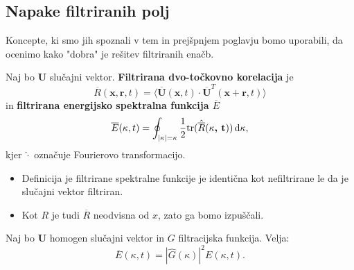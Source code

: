 \documentclass[mat2, tisk]{fmfdelo}
\newcommand{\bd}{\textbf}
\begin{document}
\subsection{Napake filtriranih polj}

Koncepte, ki smo jih spoznali v tem in prejšpnjem poglavju bomo 
uporabili, da ocenimo kako "dobra" je rešitev filtriranih enačb.

\begin{definicija}
Naj bo $\bd{U}$ slučajni vektor. \bd{Filtrirana dvo-točkovno korelacija}
je 
\begin{equation}
\overline{R}(\bd{x},\bd{r},t) = \langle \overline{\bd{U}}(\bd{x}, t) \cdot \overline{\bd{U}}^T(\bd{x} + \bd{r}, t) \rangle
\end{equation} 
in \bd{filtrirana energijsko spektralna funkcija $\overline{E}$} 
\begin{equation}
\overline{E}(\kappa, t) = \oint_{|\bd{\text{$\kappa$}}| = \kappa} \frac{1}{2} \text{tr}(\hat{\overline{R}}(\bd{\text{$\kappa$}, t})) \dif \bd{\text{$\kappa$}},
\end{equation}
kjer $\hat{\cdot}$ označuje Fourierovo transformacijo.
\end{definicija}

\begin{opomba}
\hfill
\begin{itemize}
  \item Definicija je filtrirane spektralne funkcije je identična kot nefiltrirane 
  le da je slučajni vektor filtriran.
  \item Kot $R$ je tudi $\overline{R}$ neodvisna od $x$, zato ga bomo izpuščali.
\end{itemize}
\end{opomba}

\begin{lema}
Naj bo $\bd{U}$ homogen slučajni vektor in $G$ filtracijska funkcija. Velja: 
\begin{equation}
\overline{E}(\kappa, t) = |\hat{G}(\kappa)|^2 E(\kappa, t).
\end{equation}
\end{lema}
\end{document}
